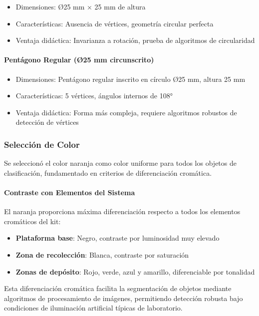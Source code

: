 \begin{itemize}
    \item Dimensiones: Ø25 mm × 25 mm de altura
    \item Características: Ausencia de vértices, geometría circular perfecta
    \item Ventaja didáctica: Invarianza a rotación, prueba de algoritmos de circularidad
\end{itemize}

\paragraph{Pentágono Regular (Ø25 mm circunscrito)}

\begin{itemize}
    \item Dimensiones: Pentágono regular inscrito en círculo Ø25 mm, altura 25 mm
    \item Características: 5 vértices, ángulos internos de 108°
    \item Ventaja didáctica: Forma más compleja, requiere algoritmos robustos de detección de vértices
\end{itemize}

\subsubsection{Selección de Color}

Se seleccionó el color naranja como color uniforme para todos los objetos de clasificación, fundamentado en criterios de diferenciación cromática.

\paragraph{Contraste con Elementos del Sistema}

El naranja proporciona máxima diferenciación respecto a todos los elementos cromáticos del kit:

\begin{itemize}
    \item \textbf{Plataforma base}: Negro, contraste por luminosidad muy elevado
    \item \textbf{Zona de recolección}: Blanca, contraste por saturación
    \item \textbf{Zonas de depósito}: Rojo, verde, azul y amarillo, diferenciable por tonalidad
\end{itemize}

Esta diferenciación cromática facilita la segmentación de objetos mediante algoritmos de procesamiento de imágenes, permitiendo detección robusta bajo condiciones de iluminación artificial típicas de laboratorio.

